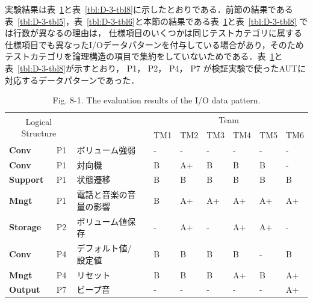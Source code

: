 \documentclass[a4paper,11pt]{jreport}
\begin{document}
  実験結果は表~\ref{tbl:D-3-tbl7}と表~\ref{tbl:D-3-tbl8}に示したとおりである．前節の結果である表~\ref{tbl:D-3-tbl5}，表~\ref{tbl:D-3-tbl6}と本節の結果である表~\ref{tbl:D-3-tbl7}と表~\ref{tbl:D-3-tbl8} では行数が異なるの理由は， 仕様項目のいくつかは同じテストカテゴリに属する仕様項目でも異なったI/Oデータパターンを付与している場合があり，そのためテストカテゴリを論理構造の項目で集約をしていないためである．表~\ref{tbl:D-3-tbl7}と表~\ref{tbl:D-3-tbl8}が示すとおり， P1， P2， P4， P7 が検証実験で使ったAUTに対応するデータパターンであった．

\begin{table}[htbp]
  \centering
  \caption{Fig. 8-1. The evaluation results of the I/O data pattern.}
    \begin{tabular}{|l|l|l|r|l|l|l|l|l|l|}
    \hline
    \multicolumn{2}{|c}{\multirow{2}[4]{*}{Logical
Structure}} & \multicolumn{1}{r}{} &       & \multicolumn{6}{c|}{Team} \bigstrut\\
\cline{5-10}    \multicolumn{2}{|c}{} & \multicolumn{1}{r}{} &       & TM1   & TM2   & TM3   & TM4   & TM5   & TM6 \bigstrut\\
    \hline
    \textbf{Conv} & P1    & ボリューム強弱 &       & -     & -     & -     & -     & -     & - \bigstrut\\
    \hline
    \textbf{Conv} & P1    & 対向機   &       & B     & A+    & B     & B     & B     & - \bigstrut\\
    \hline
    \textbf{Support} & P1    & 状態遷移  &       & B     & B     & B     & B     & B     & B \bigstrut\\
    \hline
    \textbf{Mngt} & P1    & 電話と音楽の音量の影響 &       & B     & A+    & A+    & A+    & A+    & A+ \bigstrut\\
    \hline
    \textbf{Storage} & P2    & ボリューム値保存 &       & -     & A+    & -     & A+    & A+    & - \bigstrut\\
    \hline
    \textbf{Conv} & P4    & デフォルト値/設定値 &       & B     & B     & B     & B     & -     & B \bigstrut\\
    \hline
    \textbf{Mngt} & P4    & リセット  &       & B     & B     & B     & A+    & B     & A+ \bigstrut\\
    \hline
    \textbf{Output} & P7    & ビープ音  &       & -     & -     & -     & -     & -     & A+ \bigstrut\\
    \hline
    \end{tabular}%
  \label{tbl:D-3-tbl7}%
\end{table}%
\end{document}
